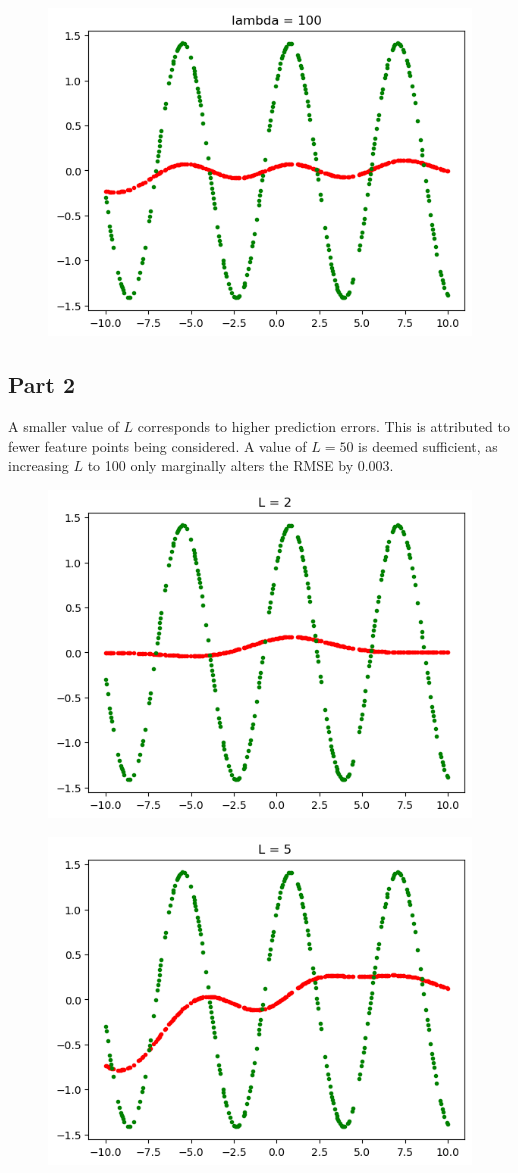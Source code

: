 \documentclass[a4paper,11pt]{article}
\begin{document}
\begin{mlsolution}
\begin{figure} [htb]
	\label{fig:1.3}
\end{figure}
\begin{figure} [htb]
	\centering
	\includegraphics[width=0.5\linewidth]{1.4.png}
	\label{fig:1.4}
\end{figure}
\subsection{Part 2}
A smaller value of \(L\) corresponds to higher prediction errors. This is attributed to fewer feature points being considered. A value of \(L = 50\) is deemed sufficient, as increasing \(L\) to 100 only marginally alters the RMSE by 0.003.
\begin{figure}[h!]
	\centering
	\includegraphics[width=0.5\linewidth]{2.1.png}
	\label{fig:2.1}
\end{figure}
\begin{figure}[h!]
	\centering
	\includegraphics[width=0.5\linewidth]{2.2.png}
	\label{fig:2.2}
\end{figure}

\end{mlsolution}
\end{document}

